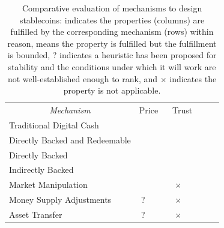 \begin{table}[t!]
\centering

	\begin{tabular}{ lllllllll}

&
\headrow{Corrects undervaluation} &
\headrow{Corrects overvaluation} &
\headrow{Decentralized issuance } &
\headrow{Decentralized redemption} &
\headrow{Decentralized transfer} &
\headrow{No trusted oracle} \\
\hline

	 \multicolumn{1}{c}{\textit{Mechanism} } &    \multicolumn{2}{|c|}{Price} &  \multicolumn{4}{c}{Trust}  \\

	\hline

	Traditional Digital Cash			& \multicolumn{1}{|c|}{\full} & \multicolumn{1}{c|}{\full}   & \multicolumn{1}{c|}{} & \multicolumn{1}{c|}{} & \multicolumn{1}{c|}{} & \multicolumn{1}{c}{\full}   \\

	\hline

	Directly Backed and Redeemable	& \multicolumn{1}{|c|}{\full} 	& \multicolumn{1}{c|}{\full}   & \multicolumn{1}{c|}{} 		& \multicolumn{1}{c|}{} 		& \multicolumn{1}{c|}{\full} & \multicolumn{1}{c}{\full}    \\
	Directly Backed                              	& \multicolumn{1}{|c|}{} 		& \multicolumn{1}{c|}{\full}   & \multicolumn{1}{c|}{ } 	& \multicolumn{1}{c|}{} 		& \multicolumn{1}{c|}{\full} & \multicolumn{1}{c}{\full}    \\
	Indirectly Backed 				& \multicolumn{1}{|c|}{\prt} 	& \multicolumn{1}{c|}{\full}   & \multicolumn{1}{c|}{\full} 	& \multicolumn{1}{c|}{\full} 	& \multicolumn{1}{c|}{\full} & \multicolumn{1}{c}{}    \\      
	Market Manipulation                       	& \multicolumn{1}{|c|}{\prt} 		& \multicolumn{1}{c|}{\prt}   & \multicolumn{1}{c|}{\full} 	& \multicolumn{1}{c|}{$\times$} 		& \multicolumn{1}{c|}{\full} & \multicolumn{1}{c}{}    \\ \hline
	Money Supply Adjustments             	& \multicolumn{1}{|c|}{?} 		& \multicolumn{1}{c|}{\full}   & \multicolumn{1}{c|}{\full} 	& \multicolumn{1}{c|}{$\times$} 		& \multicolumn{1}{c|}{\full} & \multicolumn{1}{c}{}    \\
	Asset Transfer	                                & \multicolumn{1}{|c|}{?} 		& \multicolumn{1}{c|}{\full}   & \multicolumn{1}{c|}{\full} 	& \multicolumn{1}{c|}{$\times$} 		& \multicolumn{1}{c|}{\full} & \multicolumn{1}{c}{}    \\
	\hline

	\end{tabular}
	\caption{Comparative evaluation of mechanisms to design stablecoins: {\full} indicates the properties (columns) are fulfilled by the corresponding mechanism (rows) within reason, {\prt} means the property is fulfilled but the fulfillment is bounded, {?} indicates a heuristic has been proposed for stability and the conditions under which it will work are not well-established enough to rank, and $\times$ indicates the property is not applicable.
	\label{tab:evframework}}
\end{table}


